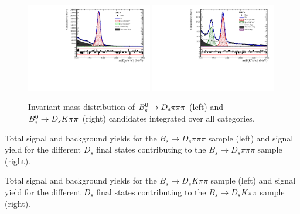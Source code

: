 \begin{figure}[h]
\centering
\includegraphics[height=!,width=0.49\textwidth]{figs/MassFit/norm_pull.pdf}
\includegraphics[height=!,width=0.49\textwidth]{figs/MassFit/signal_pull.pdf}
\caption{Invariant mass distribution of ${{B}^0_{s}}\rightarrow{\ensuremath{{D}_{s}}}{\ensuremath{\pi}}{\ensuremath{\pi}}{\ensuremath{\pi}}$ (left) and  ${{B}^0_{s}}\rightarrow{\ensuremath{{D}_{s}}}{\ensuremath{K}}{\ensuremath{\pi}}{\ensuremath{\pi}}$ (right) candidates integrated over all categories.}
\label{fig:massFit}
\end{figure}


\begin{table}[h]
\centering
\caption{Total signal and background yields for the $B_s \to D_s \pi \pi \pi$ sample (left) and
signal yield for the different $D_s$ final states contributing to the $B_s \to D_s \pi \pi \pi$ sample (right).}
 \hfill

\label{tab:massFitNorm}
\end{table}
\begin{table}[h]
\centering
\caption{Total signal and background yields for the $B_s \to D_s K \pi \pi$ sample (left) and
signal yield for the different $D_s$ final states contributing to the $B_s \to D_s  K \pi \pi$ sample (right).}
 \hfill

\label{tab:massFitSig}
\end{table}


